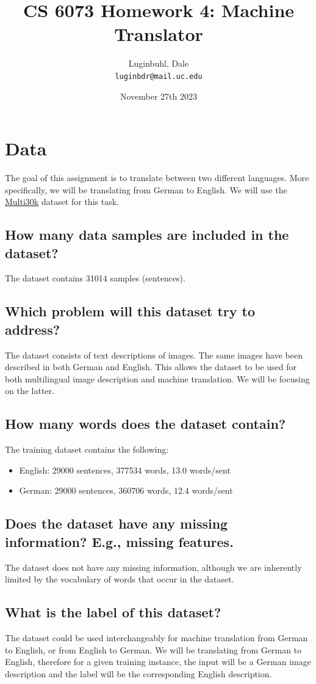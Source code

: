 \documentclass{article}
\title{CS 6073 Homework 4: Machine Translator}
\author{
    Luginbuhl, Dale \\
    \texttt{luginbdr@mail.uc.edu}
}
\date{November 27th 2023}
\begin{document}
\maketitle

\section{Data}
The goal of this assignment is to translate between two different
languages. More specifically, we will be translating from German to
English. We will use the \href{https://arxiv.org/abs/1605.00459}{Multi30k}
dataset for this task.

\subsection{How many data samples are included in the dataset?}
The dataset contains 31014 samples (sentences).

\subsection{Which problem will this dataset try to address?}
The dataset consists of text descriptions of images. The same images have
been described in both German and English. This allows the dataset to be
used for both multilingual image description and machine translation. We
will be focusing on the latter.

\subsection{How many words does the dataset contain?}
The training dataset contains the following:
\begin{itemize}
    \item  English: 29000 sentences, 377534 words, 13.0 words/sent
    \item  German: 29000 sentences, 360706 words, 12.4 words/sent
\end{itemize}

\subsection{Does the dataset have any missing information? E.g., missing features.}
The dataset does not have any missing information, although we are inherently limited
by the vocabulary of words that occur in the dataset.

\subsection{What is the label of this dataset?}
The dataset could be used interchangeably for machine translation from German to English,
or from English to German. We will be translating from German to English, therefore for a
given training instance, the input will be a German image description and the label
will be the corresponding English description.
\end{document}
